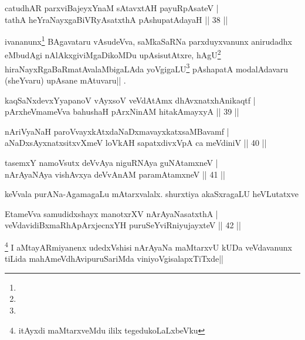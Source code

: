 
\begin{shl}
catudhAR parxviBajeyxYnaM sAtavxtAH payuRpAsateV |\\
tathA heYraNayxgaBiVRyAsatxthA pAshupatAdayaH \hfill || 38 ||
\end{shl}

\begin{artha}%
ivananunx\footnote[1]{\stext} BAgavataru vAsudeVva, saMkaSaRNa parxduyxvanunx anirudadhx eMbudAgi nAlAkxgiviMgaDikoMDu upAsisutAtxre, hAgU\footnote[2]{\stext} hiraNayxRgaBaRmatAvalaMbigaLAda yoVgigaLU\footnote[3]{\stext} pAshapatA modalAdavaru (sheYvaru) upAsane mAtuvaru|| \stext.
\end{artha}

\begin{shl}
kaqSaNxdevxYyapanoV vAyxsoV veVdAtAmx dhAvxnatxhAnikaqtf |\\
pArxheVmameVva bahushaH pArxNinAM hitakAmayxyA \hfill || 39 ||
\end{shl}

\begin{shl}
nAriVyaNaH paroV\s vayxkAtxdaNaDxmavayxkatxsaMBavamf |\\
aNaDxsAyxnatxsitxvXmeV loVkAH sapatxdivxVpA ca meVdiniV \hfill || 40 ||
\end{shl}

\begin{shl}
tasemxY namoV\s sutx deVvAya niguRNAya guNAtamxneV |\\
nArAyaNAya vishAvxya deVvAnAM paramAtamxneV \hfill || 41 ||
\end{shl}

\begin{artha}
keVvala purANa-AgamagaLu mAtarxvalalx. shurxtiya akaSxragaLU heVLutatxve
\end{artha}

\begin{shl}
EtameVva samudidxshayx manotxrXV nArAyaNasatxthA |\\
veVdavidiBxmaRhApArxjecnxYH puruSeYviRniyujayxteV \hfill || 42 ||
\end{shl}

\begin{artha}
\footnote[4]{\stext itAyxdi maMtarxveMdu ililx tegedukoLaLxbeVku} I aMtayARmiyanenx udedxVshisi nArAyaNa maMtarxvU kUDa veVdavanunx tiLida mahAmeVdhAvipuruSariMda viniyoVgisalapxTiTxde||	
\end{artha}

